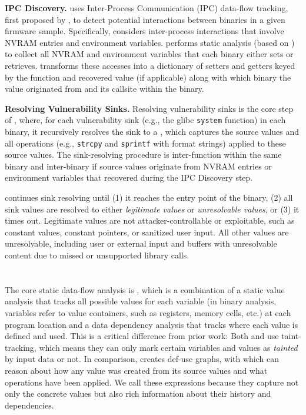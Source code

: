 \smallskip
\noindent
\textbf{IPC Discovery.}
\mango uses Inter-Process Communication (IPC) data-flow tracking, first proposed by \karonte, to detect potential interactions between binaries in a given firmware sample.
Specifically, \mango considers inter-process interactions that involve NVRAM entries and environment variables.
\mango performs static analysis (based on \rda) to collect all NVRAM and environment variables that each binary either sets or retrieves.
\mango transforms these accesses into a dictionary of setters and getters keyed by the function and recovered value (if applicable) along with which binary the value originated from and its callsite within the binary.

\smallskip
\noindent
\textbf{Resolving Vulnerability Sinks.}
Resolving vulnerability sinks is the core step of \mango, where, for each vulnerability sink (e.g., the glibc \texttt{system} function) in each binary, it recursively resolves the sink to a \emph{\richexpr}, which captures the source values and all operations (e.g., \texttt{strcpy} and \texttt{sprintf} with format strings) applied to these source values.
The sink-resolving procedure is inter-function within the same binary and inter-binary if source values originate from NVRAM entries or environment variables that \mango recovered during the IPC Discovery step.

\mango continues sink resolving until (1) it reaches the entry point of the binary, (2) all sink values are resolved to either \emph{legitimate values} or \emph{unresolvable values}, or (3) it times out.
Legitimate values are not attacker-controllable or exploitable, such as constant values, constant pointers, or sanitized user input.
All other values are unresolvable, including user or external input and buffers with unresolvable content due to missed or unsupported library calls.


\section{\rda}
\label{sec:rda}

The core static data-flow analysis is \rda, which is a combination of a static value analysis that tracks all possible values for each variable (in binary analysis, variables refer to value containers, such as registers, memory cells, etc.) at each program location and a data dependency analysis that tracks where each value is defined and used.
This is a critical difference from prior work:
Both \karonte and \satc use taint-tracking, which means they can only mark certain variables and values as \emph{tainted} by input data or not.
In comparison, \rda creates def-use graphs, with which \mango can reason about how any value was created from its source values and what operations have been applied.
We call these expressions \emph{\richexprs} because they capture not only the concrete values but also rich information about their history and dependencies.

